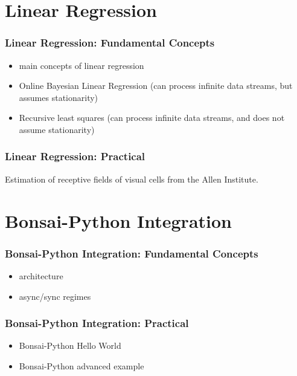 \documentclass{beamer}
\begin{document}


\section{Linear Regression}

\begin{frame}
    \frametitle{Linear Regression: Fundamental Concepts}

    \begin{itemize}
        \item main concepts of linear regression
        \item Online Bayesian Linear Regression (can process infinite data streams, but assumes stationarity)
        \item Recursive least squares (can process infinite data streams, and
            does not assume stationarity)
    \end{itemize}

\end{frame}

\begin{frame}
    \frametitle{Linear Regression: Practical}

    Estimation of receptive fields of visual cells from the Allen Institute.

\end{frame}



\section{Bonsai-Python Integration}

\begin{frame}
    \frametitle{Bonsai-Python Integration: Fundamental Concepts}

    \begin{itemize}
        \item architecture
        \item async/sync regimes
    \end{itemize}

\end{frame}

\begin{frame}
    \frametitle{Bonsai-Python Integration: Practical}

    \begin{itemize}
        \item Bonsai-Python Hello World
        \item Bonsai-Python advanced example
    \end{itemize}

\end{frame}
\end{document}
